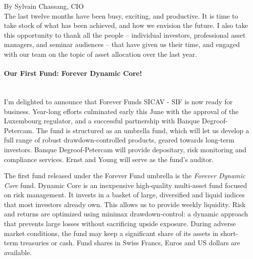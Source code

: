 \documentclass[letterpaper,12pt]{article}
\begin{document}
\pagestyle{myheader} 


\noindent By Sylvain Chassang, CIO  \\

The last twelve months have been busy, exciting, and productive. It is time to take stock of what has been achieved, and how we envision the future. I also take this opportunity to thank all the people -- individual investors, professional asset managers, and seminar audiences -- that have given us their time, and engaged with our team on the topic of asset allocation over the last year.


\paragraph{Our First Fund: Forever Dynamic Core!} $ $\\
I'm delighted to announce that Forever Funds SICAV - SIF is now ready for business.  Year-long efforts culminated early this June with the approval of  the Luxembourg regulator, and a successful partnership with Banque Degroof-Petercam. The fund is structured as an umbrella fund, which will let us develop a full range of robust drawdown-controlled products, geared towards  long-term investors. Banque Degroof-Petercam will provide depositary, risk monitoring and compliance services. Ernst and Young will serve as the fund's auditor. 

The first fund released under the Forever Fund umbrella is the \emph{Forever Dynamic Core} fund. Dynamic Core is an inexpensive high-quality multi-asset fund focused on risk management. It invests in a basket of large, diversified and liquid indices that most investors already own. This allows us to provide weekly liquidity. Risk and returns are optimized using minimax drawdown-control: a dynamic approach that prevents large losses without sacrificing  upside exposure. During adverse market conditions, the fund may keep a significant share of its assets in short-term treasuries or cash. Fund shares in Swiss Francs, Euros and US dollars are available.
\end{document}
